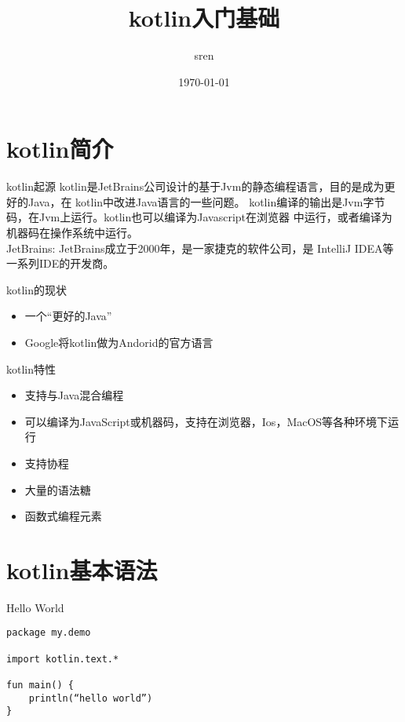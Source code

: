 \documentclass[UTF8]{ctexbeamer}
\begin{document}
\begin{frame}
  \title{kotlin入门基础} \author{sren} \date{\today}
  \maketitle
\end{frame}

\begin{frame}
  \normalsize
  \tableofcontents
\end{frame}


\section{kotlin简介}
\frame{\tableofcontents[currentsection]} %

\begin{frame}{kotlin起源}
  kotlin是JetBrains公司设计的基于Jvm的静态编程语言，目的是成为更好的Java，在
  kotlin中改进Java语言的一些问题。
  kotlin编译的输出是Jvm字节码，在Jvm上运行。kotlin也可以编译为Javascript在浏览器
  中运行，或者编译为机器码在操作系统中运行。\\
  \vspace{5em}
  JetBrains: JetBrains成立于2000年，是一家捷克的软件公司，是 IntelliJ IDEA等一系列IDE的开发商。
\end{frame}

\begin{frame}{kotlin的现状}
  \begin{itemize}
  \item 一个“更好的Java” 
  \item Google将kotlin做为Andorid的官方语言
  \end{itemize}
\end{frame}

\begin{frame}{kotlin特性}
  \begin{itemize}
  \item 支持与Java混合编程
  \item 可以编译为JavaScript或机器码，支持在浏览器，Ios，MacOS等各种环境下运行
  \item 支持协程
  \item 大量的语法糖
  \item 函数式编程元素
  \end{itemize}
\end{frame}


\section{kotlin基本语法}
\frame{\tableofcontents[currentsection]}
\begin{frame}[fragile]{Hello World}
\begin{lstlisting}
package my.demo

import kotlin.text.*

fun main() {
    println(“hello world”)
}
\end{lstlisting}
\end{frame}
\end{document}
